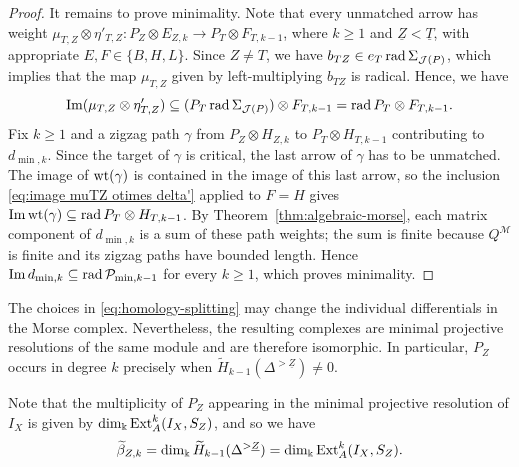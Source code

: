 \documentclass[a4paper,leqno]{amsart}
\begin{document}
\begin{proof}
It remains to prove minimality. Note that every unmatched arrow has weight $\mu_{T,Z}\otimes\eta'_{T,Z}:P_Z\otimes E_{Z,k}\to P_T\otimes F_{T,k-1}$, where $k\geq1$ and $\underline{Z}<\underline{T}$, with appropriate $E,F\in\{B,H,L\}$.
Since $Z\neq T$, we have $b_{TZ}\in e_T\operatorname{rad}\Sigma_{\mathcal J(P)}$, which implies that the map $\mu_{T,Z}$ given by left-multiplying $b_{TZ}$ is radical.  Hence, we have
\begin{equation}\label{eq:image muTZ otimes delta'}    
 \operatorname{Im}(\mu_{T,Z}\otimes\eta'_{T,Z})
 \subseteq (P_T\operatorname{rad}\Sigma_{\mathcal J(P)})\otimes F_{T,k-1}
 = \operatorname{rad} P_T\otimes F_{T,k-1}.
\end{equation}
Fix $k\geq1$ and a zigzag path $\gamma$ from $P_Z\otimes H_{Z,k}$ to $P_T\otimes H_{T,k-1}$ contributing to $d_{\min,k}$. Since the target of $\gamma$ is critical, the last arrow of $\gamma$ has to be unmatched. 
The image of $\operatorname{wt}(\gamma)$ is contained in the image of this last arrow, so the inclusion \eqref{eq:image muTZ otimes delta'} applied to $F=H$ gives $\operatorname{Im}\operatorname{wt}(\gamma)\subseteq\operatorname{rad} P_T\otimes H_{T,k-1}$. By Theorem~\ref{thm:algebraic-morse}, each matrix component of $d_{\min,k}$ is a sum of these path weights; the sum is finite because $Q^{\mathcal M}$ is finite and its zigzag paths have bounded length. Hence $\operatorname{Im} d_{\min,k}\subseteq\operatorname{rad}\mathcal P_{\min,k-1}$ for every $k\geq1$, which proves minimality.
\end{proof}

The choices in \eqref{eq:homology-splitting} may change the individual differentials in the Morse complex.  Nevertheless, the resulting complexes are minimal projective resolutions of the same module and are therefore isomorphic.  In particular, $P_Z$ occurs in degree $k$ precisely when $\widetilde H_{k-1}(\Delta^{>\underline{Z}})\neq0$.

\begin{rmk}
Note that the multiplicity of $P_Z$ appearing in the minimal projective resolution of $I_X$ is given by $\dim_\Bbbk\operatorname{Ext}_A^k(I_X,S_Z)$, and so we have 
\[\widetilde{\beta}_{Z,k}=\dim_{\Bbbk}\widetilde H_{k-1}(\Delta^{>\underline{Z}})=\dim_{\Bbbk}\operatorname{Ext}_A^k(I_X,S_Z).
 \]
\end{rmk}
\end{document}
